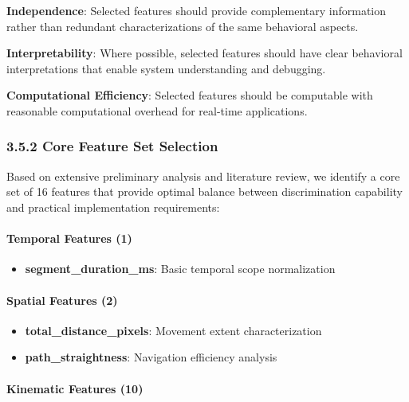 \documentclass[
  11pt,
  a4paper,
]{article}
\providecommand{\tightlist}{%
  \setlength{\itemsep}{0pt}\setlength{\parskip}{0pt}}
\begin{document}
\textbf{Independence}: Selected features should provide complementary
information rather than redundant characterizations of the same
behavioral aspects.

\textbf{Interpretability}: Where possible, selected features should have
clear behavioral interpretations that enable system understanding and
debugging.

\textbf{Computational Efficiency}: Selected features should be
computable with reasonable computational overhead for real-time
applications.

\subsubsection{3.5.2 Core Feature Set
Selection}\label{core-feature-set-selection}

Based on extensive preliminary analysis and literature review, we
identify a core set of 16 features that provide optimal balance between
discrimination capability and practical implementation requirements:

\paragraph{Temporal Features (1)}\label{temporal-features-1}

\begin{itemize}
\tightlist
\item
  \textbf{segment\_duration\_ms}: Basic temporal scope normalization
\end{itemize}

\paragraph{Spatial Features (2)}\label{spatial-features-2}

\begin{itemize}
\tightlist
\item
  \textbf{total\_distance\_pixels}: Movement extent characterization
\item
  \textbf{path\_straightness}: Navigation efficiency analysis
\end{itemize}

\paragraph{Kinematic Features (10)}\label{kinematic-features-10}
\end{document}
